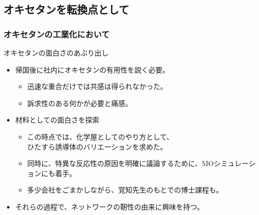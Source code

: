 \documentclass[unicode,12pt]{beamer}%
\begin{document}
\subsection{オキセタンを転換点として}
\begin{frame}
    \frametitle{オキセタンの工業化において}
    \begin{block}{オキセタンの面白さのあぶり出し}
        \begin{itemize}
            \item 帰国後に社内にオキセタンの有用性を説く必要。
            \begin{itemize}
                \item 迅速な重合だけでは共感は得られなかった。
                \item 訴求性のある何かが必要と痛感。
            \end{itemize}
            \item 材料としての面白さを探索
            \begin{itemize}
                \item この時点では、化学屋としてのやり方として、\\ひたすら誘導体のバリエーションを求めた。
                \item 同時に、特異な反応性の原因を明確に議論するために、\alert{MOシミュレーション}にも着手。
                \item 多少会社をごまかしながら、覚知先生のもとでの博士課程も。
            \end{itemize}
            \item それらの過程で、ネットワークの靭性の由来に興味を持つ。
        \end{itemize}
    \end{block}
\end{frame}
\end{document}
